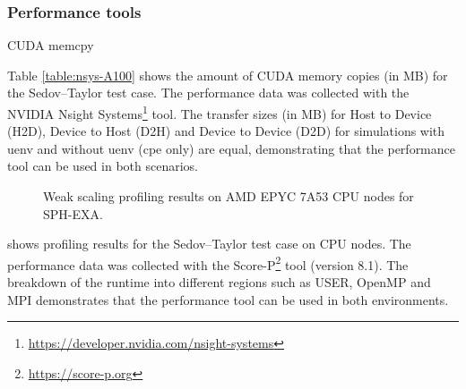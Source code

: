 \subsubsection{Performance tools}

\begin{table}[htp!]
    \centering
    \caption{CUDA memcpy}
    \label{table:nsys-A100}
\end{table}

Table \ref{table:nsys-A100} shows the amount of CUDA memory copies (in MB) for the Sedov--Taylor test case.
The performance data was collected with the NVIDIA {Nsight Systems\footnote{\url{https://developer.nvidia.com/nsight-systems}}}  tool.
The transfer sizes (in MB) for Host to Device (H2D), Device to Host (D2H) and Device to Device (D2D) for simulations with uenv and without uenv (cpe only) are equal, demonstrating that the performance tool can be used in both scenarios.

\begin{figure}[htp!]
    \begin{center}
        
    \end{center}
    \caption{Weak scaling profiling results on AMD EPYC 7A53 CPU nodes for SPH-EXA.}
    \label{fig:sph-weak-scorep}
\end{figure}

 shows profiling results for the Sedov--Taylor test case on CPU nodes.
The performance data was collected with the Score-P\footnote{\url{https://score-p.org}} tool (version 8.1).
The breakdown of the runtime into different regions such as USER, OpenMP and MPI demonstrates that the performance tool can be used in both environments.



